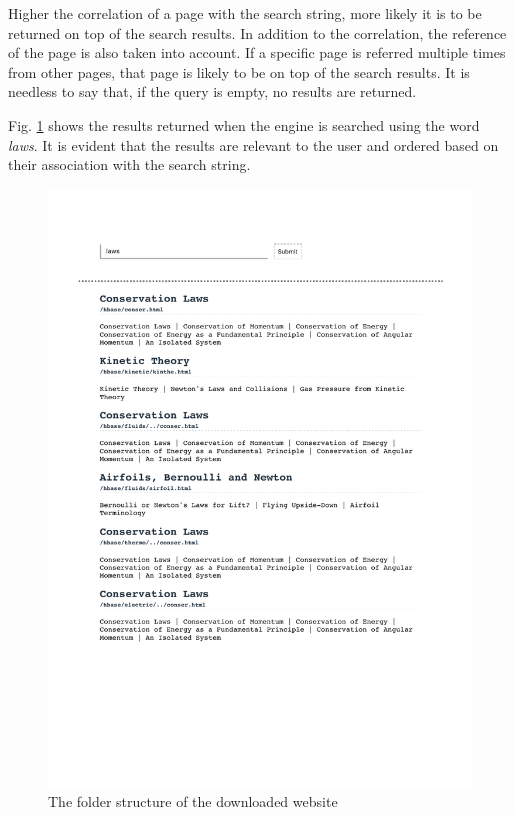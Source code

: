 \documentclass{project_report}
\begin{document}
Higher the correlation of a page with the search string, more likely it is to be returned on top of the search results. In addition to the correlation, the reference of the page is also taken into account. If a specific page is referred multiple times from other pages, that page is likely to be on top of the search results. It is needless to say that, if the query is empty, no results are returned.

Fig. \ref{search-sc} shows the results returned when the engine is searched using the word \emph{laws}. It is evident that the results are relevant to the user and ordered based on their association with the search string.

\begin{figure}[!hbt]
  \centering
  \includegraphics[trim={0 0 0 1.5cm},clip, width=\textwidth]{search-sc}
  \caption{The folder structure of the downloaded website}
  \label{search-sc}
\end{figure}
\end{document}
